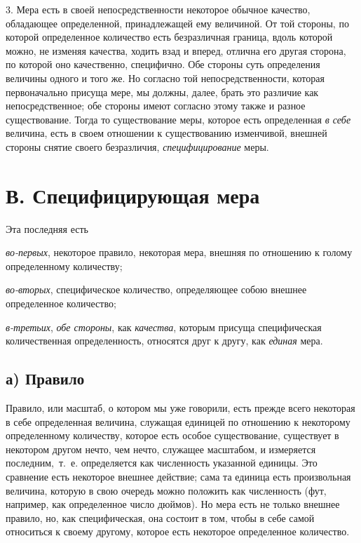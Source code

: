 3. Мера есть в своей непосредственности некоторое обычное качество,
обладающее определенной, принадлежащей ему величиной. От той стороны, по
которой определенное количество есть безразличная граница, вдоль которой
можно, не изменяя качества, ходить взад и вперед, отлична его другая
сторона, по которой оно качественно, специфично. Обе стороны суть
определения величины одного и того же. Но согласно той непосредственности,
которая первоначально присуща мере, мы должны, далее, брать это различие
как непосредственное; обе стороны имеют согласно этому также и разное
существование. Тогда то существование меры, которое есть определенная
{\em в себе} величина, есть в своем отношении к
существованию изменчивой, внешней стороны снятие своего безразличия,
{\em специфицирование} меры.

\section[В. Специфицирующая мера]{В. Специфицирующая мера}
\hypertarget{Toc478978673}{}Эта последняя есть

{\em во-первых}, некоторое правило, некоторая мера,
внешняя по отношению к голому определенному количеству;

{\em во-вторых}, специфическое количество, определяющее
собою внешнее определенное количество;

{\em в-третьих}, {\em обе стороны},
как {\em качества}, которым присуща специфическая
количественная определенность, относятся друг к другу, как
{\em единая} мера.

\subsection[а) Правило (61)]{а) Правило}
Правило, или масштаб, о котором
мы уже говорили, есть прежде всего некоторая в себе определенная величина,
служащая единицей по отношению к некоторому определенному количеству,
которое есть особое существование, существует в некотором другом нечто, чем
нечто, служащее масштабом, и измеряется последним,~т.~е. определяется как
численность указанной единицы. Это сравнение есть некоторое внешнее
действие; сама та единица есть произвольная величина, которую в свою
очередь можно положить как численность (фут, например, как определенное
число дюймов). Но мера есть не только внешнее правило, но, как
специфическая, она состоит в том, чтобы в себе самой относиться к своему
другому, которое есть некоторое определенное количество.

